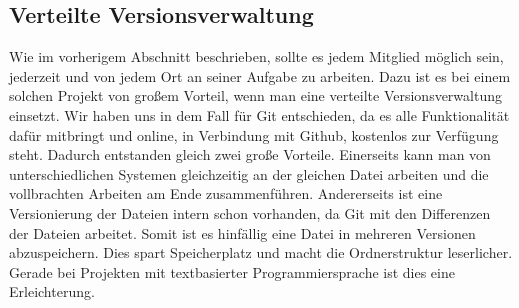\subsection{Verteilte Versionsverwaltung}
Wie im vorherigem Abschnitt beschrieben, sollte es jedem Mitglied m\"oglich sein, jederzeit und von jedem Ort an seiner Aufgabe zu arbeiten. Dazu ist es bei einem solchen Projekt von gro\ss em Vorteil, wenn man eine verteilte Versionsverwaltung einsetzt. Wir haben uns in dem Fall f\"ur Git entschieden, da es alle Funktionalit\"at daf\"ur mitbringt und online, in Verbindung mit Github, kostenlos zur Verf\"ugung steht. Dadurch entstanden gleich zwei gro\ss e Vorteile. Einerseits kann man von unterschiedlichen Systemen gleichzeitig an der gleichen Datei arbeiten und die vollbrachten Arbeiten am Ende zusammenf\"uhren. Andererseits ist eine Versionierung der Dateien intern schon vorhanden, da Git mit den Differenzen der Dateien arbeitet. Somit ist es hinf\"allig eine Datei in mehreren Versionen abzuspeichern. Dies spart Speicherplatz und macht die Ordnerstruktur leserlicher. Gerade bei Projekten mit textbasierter Programmiersprache ist dies eine Erleichterung.
